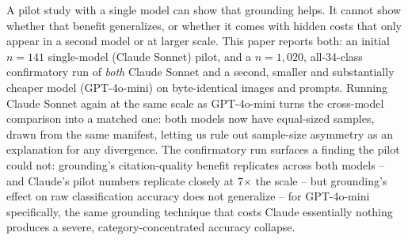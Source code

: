 \documentclass[11pt]{article}
\begin{document}
A pilot study with a single model can show that grounding helps. It cannot show whether that
benefit generalizes, or whether it comes with hidden costs that only appear in a second model or
at larger scale. This paper reports both: an initial $n=141$ single-model (Claude Sonnet) pilot,
and a $n=1{,}020$, all-34-class confirmatory run of \emph{both} Claude Sonnet and a second,
smaller and substantially cheaper model (GPT-4o-mini) on byte-identical images and prompts. Running
Claude Sonnet again at the same scale as GPT-4o-mini turns the cross-model comparison into a
matched one: both models now have equal-sized samples, drawn from the same manifest, letting us
rule out sample-size asymmetry as an explanation for any divergence. The confirmatory run surfaces
a finding the pilot could not: grounding's citation-quality benefit replicates across both models
-- and Claude's pilot numbers replicate closely at 7$\times$ the scale -- but grounding's effect
on raw classification accuracy does not generalize -- for GPT-4o-mini specifically, the same
grounding technique that costs Claude essentially nothing produces a severe, category-concentrated
accuracy collapse.
\end{document}
